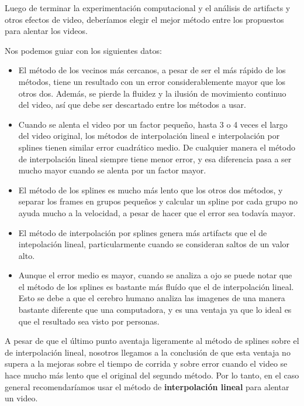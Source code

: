 Luego de terminar la experimentaci\'on computacional y el an\'alisis de artifacts y otros efectos de video, deber\'iamos elegir el mejor m\'etodo entre los propuestos para alentar los videos.

Nos podemos guiar con los siguientes datos:

\vspace{-2ex}

\begin{itemize}
	\item El m\'etodo de los vecinos m\'as cercanos, a pesar de ser el m\'as r\'apido de los m\'etodos, tiene un resultado con un error considerablemente mayor que los otros dos. Adem\'as, se pierde la fluidez y la ilusi\'on de movimiento continuo del video, as\'i que debe ser descartado entre los m\'etodos a usar.
	\item Cuando se alenta el video por un factor peque\~no, hasta 3 o 4 veces el largo del video original, los m\'etodos de interpolaci\'on lineal e interpolaci\'on por splines tienen similar error cuadr\'atico medio. De cualquier manera el m\'etodo de interpolaci\'on lineal siempre tiene menor error, y esa diferencia pasa a ser mucho mayor cuando se alenta por un factor mayor.
	\item El m\'etodo de los splines es mucho m\'as lento que los otros dos m\'etodos, y separar los frames en grupos peque\~nos y calcular un spline por cada grupo no ayuda mucho a la velocidad, a pesar de hacer que el error sea todav\'ia mayor.
	\item El m\'etodo de interpolaci\'on por splines genera m\'as artifacts que el de intepolaci\'on lineal, particularmente cuando se consideran saltos de un valor alto.
	\item Aunque el error medio es mayor, cuando se analiza a ojo se puede notar que el m\'etodo de los splines es bastante m\'as flu\'ido que el de interpolaci\'on lineal. Esto se debe a que el cerebro humano analiza las imagenes de una manera bastante diferente que una computadora, y es una ventaja ya que lo ideal es que el resultado sea visto por personas.
\end{itemize}

A pesar de que el \'ultimo punto aventaja ligeramente al m\'etodo de splines sobre el de interpolaci\'on lineal, nosotros llegamos a la conclusi\'on de que esta ventaja no supera a la mejoras sobre el tiempo de corrida y sobre error cuando el video se hace mucho m\'as lento que el original del segundo m\'etodo. Por lo tanto, en el caso general recomendar\'iamos usar el m\'etodo de \textbf{interpolaci\'on lineal} para alentar un video.

